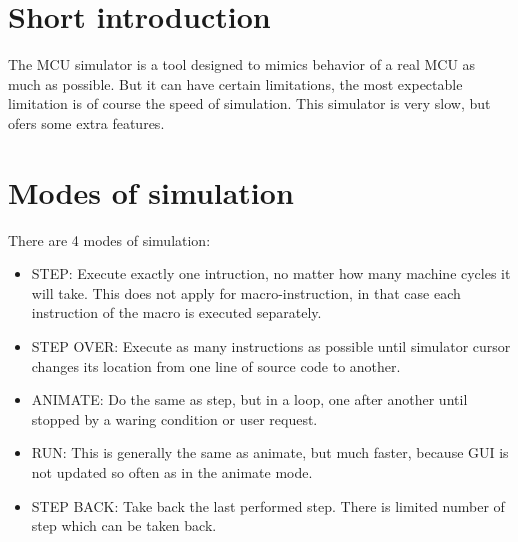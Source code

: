 
        \section{Short introduction}
        The MCU simulator is a tool designed to mimics behavior of a real MCU as
        much as possible. But it can have certain limitations, the most expectable
        limitation is of course the speed of simulation. This simulator is very slow,
        but ofers some extra features.
        \section{Modes of simulation}
        There are 4 modes of simulation:
            \begin{itemize}
                \item STEP: Execute exactly one intruction, no matter how many machine
                        cycles it will take. This does not apply for macro-instruction,
                        in that case each instruction of the macro is executed separately.
                \item STEP OVER: Execute as many instructions as possible until simulator
                cursor changes its location from one line of source code to another.
                \item ANIMATE: Do the same as step, but in a loop, one after another until
                stopped by a waring condition or user request.
                \item RUN: This is generally the same as animate, but much faster, because
                GUI is not updated so often as in the animate mode.
                \item STEP BACK: Take back the last performed step. There is limited number
                of step which can be taken back.
            \end{itemize}
